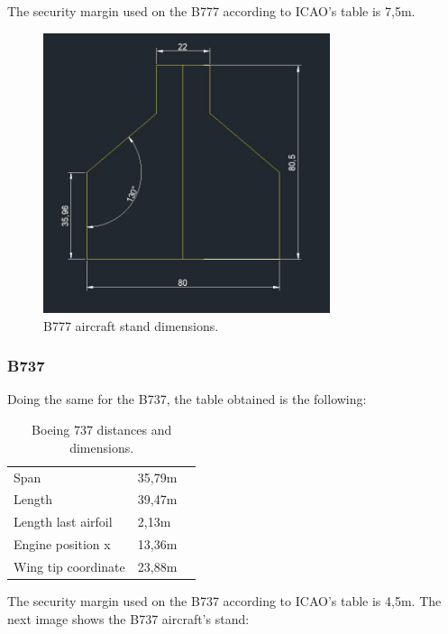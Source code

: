 		The security margin used on the B777 according to ICAO's table is 7,5m.
		
		\begin{figure}[H]
			\centering
			\includegraphics[clip, trim=0cm 0cm 0cm 0cm, width=0.75\textwidth]{./images/B777/StandB777}
			\caption{B777 aircraft stand dimensions.} %
			\label{} %
		\end{figure}
				
		\subsubsection{B737}
		Doing the same for the B737, the table obtained is the following:
		
		\begin{table}[htb]
			\centering
			\begin{tabular}{ll p{5cm}}
				\midrule[2pt]
				Span & 35,79m\\
				Length & 39,47m\\
				Length last airfoil& 2,13m \\
				Engine position x & 13,36m\\
				Wing tip coordinate & 23,88m\\
				\bottomrule[2pt]
			\end{tabular}
			\caption{Boeing 737 distances and dimensions.}
			\label{Boeing737distances}
		\end{table}
		
		The security margin used on the B737 according to ICAO's table is 4,5m.
		The next image shows the B737 aircraft's stand:
		
